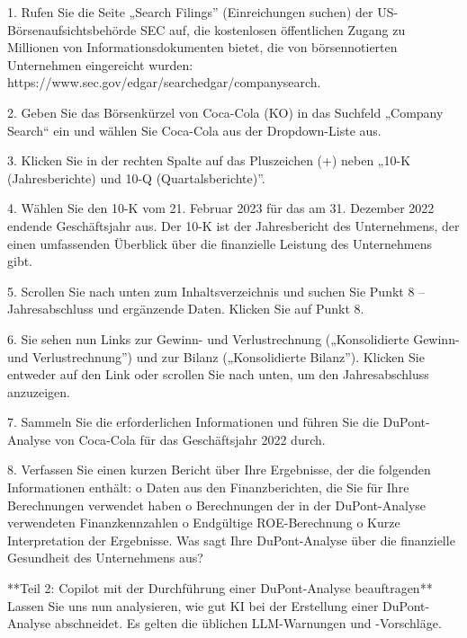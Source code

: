 \documentclass[
  ngerman,
  letterpaper,
  DIV=11]{scrreprt}
\newenvironment{Shaded}{\begin{snugshade}}{\end{snugshade}}
\newcommand{\NormalTok}[1]{\textcolor[rgb]{0.00,0.23,0.31}{#1}}
\newcommand{\SpecialStringTok}[1]{\textcolor[rgb]{0.13,0.47,0.30}{#1}}
\begin{document}
\begin{tcolorbox}
\begin{Shaded}
\begin{Highlighting}[]
\SpecialStringTok{1.  }\NormalTok{Rufen Sie die Seite „Search Filings” (Einreichungen suchen) der US{-}Börsenaufsichtsbehörde SEC auf, die kostenlosen öffentlichen Zugang zu Millionen von Informationsdokumenten bietet, die von börsennotierten Unternehmen eingereicht wurden: https://www.sec.gov/edgar/searchedgar/companysearch.}

\SpecialStringTok{2.  }\NormalTok{Geben Sie das Börsenkürzel von Coca{-}Cola (KO) in das Suchfeld „Company Search“ ein und wählen Sie Coca{-}Cola aus der Dropdown{-}Liste aus.}

\SpecialStringTok{3.  }\NormalTok{Klicken Sie in der rechten Spalte auf das Pluszeichen (+) neben „10{-}K (Jahresberichte) und 10{-}Q (Quartalsberichte)”.}

\SpecialStringTok{4.  }\NormalTok{Wählen Sie den 10{-}K vom 21. Februar 2023 für das am 31. Dezember 2022 endende Geschäftsjahr aus. Der 10{-}K ist der Jahresbericht des Unternehmens, der einen umfassenden Überblick über die finanzielle Leistung des Unternehmens gibt.}

\SpecialStringTok{5.  }\NormalTok{Scrollen Sie nach unten zum Inhaltsverzeichnis und suchen Sie Punkt 8 – Jahresabschluss und ergänzende Daten. Klicken Sie auf Punkt 8.}

\SpecialStringTok{6.  }\NormalTok{Sie sehen nun Links zur Gewinn{-} und Verlustrechnung („Konsolidierte Gewinn{-} und Verlustrechnung”) und zur Bilanz („Konsolidierte Bilanz”). Klicken Sie entweder auf den Link oder scrollen Sie nach unten, um den Jahresabschluss anzuzeigen.}

\SpecialStringTok{7.  }\NormalTok{Sammeln Sie die erforderlichen Informationen und führen Sie die DuPont{-}Analyse von Coca{-}Cola für das Geschäftsjahr 2022 durch.}

\SpecialStringTok{8.  }\NormalTok{Verfassen Sie einen kurzen Bericht über Ihre Ergebnisse, der die folgenden Informationen enthält:}
\NormalTok{o   Daten aus den Finanzberichten, die Sie für Ihre Berechnungen verwendet haben}
\NormalTok{o   Berechnungen der in der DuPont{-}Analyse verwendeten Finanzkennzahlen}
\NormalTok{o   Endgültige ROE{-}Berechnung}
\NormalTok{o   Kurze Interpretation der Ergebnisse. Was sagt Ihre DuPont{-}Analyse über die finanzielle Gesundheit des Unternehmens aus?}

\NormalTok{**Teil 2: Copilot mit der Durchführung einer DuPont{-}Analyse beauftragen**}
\NormalTok{Lassen Sie uns nun analysieren, wie gut KI bei der Erstellung einer DuPont{-}Analyse abschneidet. Es gelten die üblichen LLM{-}Warnungen und {-}Vorschläge.}


\end{Highlighting}
\end{Shaded}
\end{tcolorbox}
\end{document}
